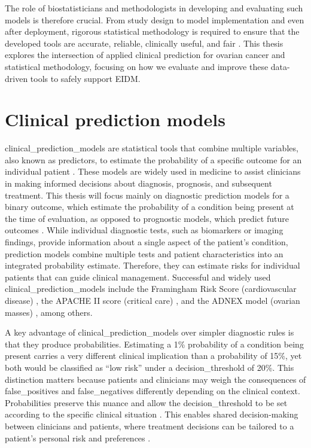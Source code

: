 The role of biostatisticians and methodologists in developing and evaluating such models is therefore crucial. From study design to model implementation and even after deployment, rigorous statistical methodology is required to ensure that the developed tools are accurate, reliable, clinically useful, and fair \cite{collinsTRIPODAIStatementUpdated2024}. This thesis explores the intersection of applied clinical prediction for ovarian cancer and statistical methodology, focusing on how we evaluate and improve these data-driven tools to safely support \gls{EIDM}.


\section{Clinical prediction models}

\Glspl{clinical_prediction_model} are statistical tools that combine multiple variables, also known as \glspl{predictor}, to estimate the probability of a specific outcome for an individual patient \cite{steyerbergClinicalPredictionModels2009}. These models are widely used in medicine to assist clinicians in making informed decisions about \gls{diagnosis}, \gls{prognosis}, and subsequent treatment. This thesis will focus mainly on diagnostic prediction models for a binary outcome, which estimate the probability of a condition being present at the time of evaluation, as opposed to prognostic models, which predict future outcomes \cite{vansmedenClinicalPredictionModels2021}. While individual diagnostic tests, such as biomarkers or imaging findings, provide information about a single aspect of the patient's condition, prediction models combine multiple tests and patient characteristics into an integrated probability estimate. Therefore, they can estimate risks for individual patients that can guide clinical management. Successful and widely used \glspl{clinical_prediction_model} include the Framingham Risk Score (cardiovascular disease) \cite{dagostinoGeneralCardiovascularRisk2008}, the APACHE II score (critical care) \cite{knausAPACHEIISeverity1985}, and the \gls{ADNEX} model (ovarian masses) \cite{vancalsterEvaluatingRiskOvarian2014}, among others.

A key advantage of \glspl{clinical_prediction_model} over simpler diagnostic rules is that they produce probabilities. Estimating a 1\% probability of a condition being present carries a very different clinical implication than a probability of 15\%, yet both would be classified as ``low risk'' under a \gls{decision_threshold} of 20\%. This distinction matters because patients and clinicians may weigh the consequences of \glspl{false_positive} and \glspl{false_negative} differently depending on the clinical context. Probabilities preserve this nuance and allow the \gls{decision_threshold} to be set according to the specific clinical situation \cite{vickersDecisionCurveAnalysis2006}. This enables shared decision-making between clinicians and patients, where treatment decisions can be tailored to a patient's personal risk and preferences \cite{steyerbergClinicalPredictionModels2009, moonsCriticalAppraisalData2014}.

